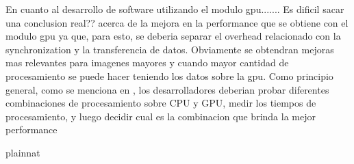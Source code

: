 \documentclass[a4paper,10pt]{report}
\begin{document}
En cuanto al desarrollo de software utilizando el modulo gpu.......
Es dificil sacar una conclusion   real??  acerca de la mejora en la performance que se obtiene con el modulo gpu ya que, para esto, se deberia separar el overhead relacionado con la synchronization y la transferencia de datos.
Obviamente se obtendran mejoras mas relevantes para imagenes mayores y cuando mayor cantidad de procesamiento se puede hacer teniendo los datos sobre la gpu.
Como principio general, como se menciona en  \cite{pulli2012real}  , los desarrolladores deberian probar diferentes combinaciones de procesamiento sobre CPU y GPU, medir los tiempos de procesamiento, y luego decidir cual es la combinacion que brinda la mejor performance





 {plainnat}




  
\end{document}
